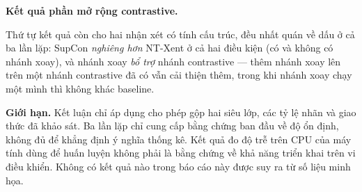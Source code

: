 \medskip
\noindent\textbf{Kết quả phần mở rộng contrastive.}
\RExtensionConclusion

Thứ tự kết quả còn cho hai nhận xét có tính cấu trúc, đều nhất quán về dấu ở cả ba lần lặp:
SupCon \emph{nghiêng hơn} NT-Xent ở cả hai điều kiện (có và không có nhánh xoay), và nhánh xoay
\emph{bổ trợ} nhánh contrastive — thêm nhánh xoay lên trên một nhánh contrastive đã có vẫn cải
thiện thêm, trong khi nhánh xoay chạy một mình thì không khác baseline.

\medskip
\noindent\textbf{Giới hạn.}
Kết luận chỉ áp dụng cho phép gộp hai siêu lớp, các tỷ lệ nhãn và giao thức đã khảo sát.
Ba lần lặp chỉ cung cấp bằng chứng ban đầu về độ ổn định, không đủ để khẳng định ý nghĩa
thống kê. Kết quả đo độ trễ trên CPU của máy tính dùng để huấn luyện không phải là bằng chứng
về khả năng triển khai trên vi điều khiển. Không có kết quả nào trong báo cáo này được suy ra
từ số liệu minh họa.
